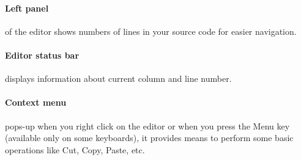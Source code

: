         \paragraph{Left panel} of the editor shows numbers of lines in your source code for easier navigation.

        \paragraph{Editor status bar} displays information about current column and line number.

        \paragraph{Context menu} pops-up when you right click on the editor or when you press the Menu key (available only on some keyboards), it provides means to perform some basic operations like Cut, Copy, Paste, etc.

